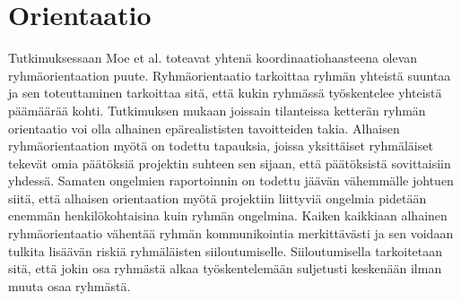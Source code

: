 \section{Orientaatio}

Tutkimuksessaan Moe et al. \cite{MOE2012853} toteavat yhtenä koordinaatiohaasteena olevan ryhmäorientaation puute. Ryhmäorientaatio tarkoittaa ryhmän yhteistä suuntaa ja sen toteuttaminen tarkoittaa sitä, että kukin ryhmässä työskentelee yhteistä päämäärää kohti. Tutkimuksen mukaan joissain tilanteissa ketterän ryhmän orientaatio voi olla alhainen epärealististen tavoitteiden takia. Alhaisen ryhmäorientaation myötä on todettu tapauksia, joissa yksittäiset ryhmäläiset tekevät omia päätöksiä projektin suhteen sen sijaan, että päätöksistä sovittaisiin yhdessä. Samaten ongelmien raportoinnin on todettu jäävän vähemmälle johtuen siitä, että alhaisen orientaation myötä projektiin liittyviä ongelmia pidetään enemmän henkilökohtaisina kuin ryhmän ongelmina. Kaiken kaikkiaan alhainen ryhmäorientaatio vähentää ryhmän kommunikointia merkittävästi ja sen voidaan tulkita lisäävän riskiä ryhmäläisten siiloutumiselle. Siiloutumisella tarkoitetaan sitä, että jokin osa ryhmästä alkaa työskentelemään suljetusti keskenään ilman muuta osaa ryhmästä.
